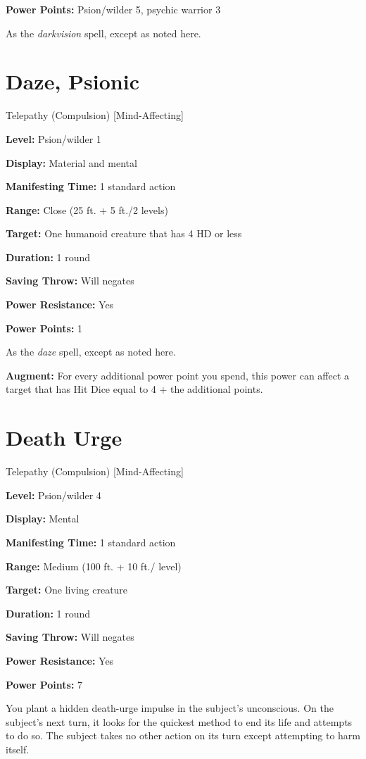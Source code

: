 \documentclass{article}
\begin{document}
\textbf{Power Points:} Psion/wilder 5, psychic warrior 3

As the \textit{darkvision }spell, except as noted here.

\vspace{12pt}
\section*{Daze, Psionic}

Telepathy (Compulsion) [Mind-Affecting]

\textbf{Level:} Psion/wilder 1

\textbf{Display:} Material and mental

\textbf{Manifesting Time:} 1 standard action

\textbf{Range:} Close (25 ft. + 5 ft./2 levels)

\textbf{Target:} One humanoid creature that has 4 HD or less

\textbf{Duration:} 1 round

\textbf{Saving Throw:} Will negates

\textbf{Power Resistance:} Yes

\textbf{Power Points:} 1

As the \textit{daze }spell, except as noted here.

\textbf{Augment:} For every additional power point you spend, this power can affect 
a target that has Hit Dice equal to 4 + the additional points.

\vspace{12pt}
\section*{Death Urge}

Telepathy (Compulsion) [Mind-Affecting]

\textbf{Level:} Psion/wilder 4

\textbf{Display:} Mental

\textbf{Manifesting Time:} 1 standard action

\textbf{Range:} Medium (100 ft. + 10 ft./ level)

\textbf{Target:} One living creature

\textbf{Duration:} 1 round

\textbf{Saving Throw:} Will negates

\textbf{Power Resistance:} Yes

\textbf{Power Points:} 7

You plant a hidden death-urge impulse in the subject's unconscious. On the subject's 
next turn, it looks for the quickest method to end its life and attempts to do 
so. The subject takes no other action on its turn except attempting to harm itself.
\end{document}
